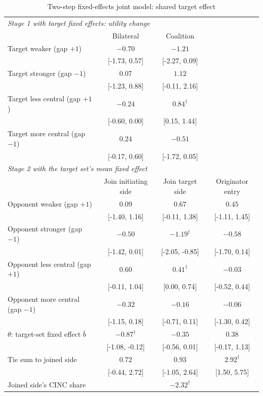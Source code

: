 \documentclass[11pt]{article}
\begin{document}
\clearpage
\begin{table}[!htbp]\centering\small
\caption{Two-step fixed-effects joint model: shared target effect}\label{tab:jointfe}
\begin{tabular}{lccc}
\toprule
\multicolumn{4}{l}{\emph{Stage 1 with target fixed effects: utility change}} \\
 & Bilateral & Coalition & \\
Target weaker (gap $+1$) & $-0.70$ & $-1.21$ &  \\
 & [-1.73, 0.57] & [-2.27, 0.09] &  \\
Target stronger (gap $-1$) & $0.07$ & $1.12$ &  \\
 & [-1.23, 0.88] & [-0.11, 2.16] &  \\
Target less central (gap $+1$) & $-0.24$ & $0.84^{\dagger}$ &  \\
 & [-0.60, 0.00] & [0.15, 1.44] &  \\
Target more central (gap $-1$) & $0.24$ & $-0.51$ &  \\
 & [-0.17, 0.60] & [-1.72, 0.05] &  \\
\midrule
\multicolumn{4}{l}{\emph{Stage 2 with the target set's mean fixed effect}} \\
 & Join initiating side & Join target side & Originator entry \\
Opponent weaker (gap $+1$) & $0.09$ & $0.67$ & $0.45$ \\
 & [-1.40, 1.16] & [-0.11, 1.38] & [-1.11, 1.45] \\
Opponent stronger (gap $-1$) & $-0.50$ & $-1.19^{\dagger}$ & $-0.58$ \\
 & [-1.42, 0.01] & [-2.05, -0.85] & [-1.70, 0.14] \\
Opponent less central (gap $+1$) & $0.60$ & $0.41^{\dagger}$ & $-0.03$ \\
 & [-0.11, 1.04] & [0.00, 0.74] & [-0.52, 0.44] \\
Opponent more central (gap $-1$) & $-0.32$ & $-0.16$ & $-0.06$ \\
 & [-1.15, 0.18] & [-0.71, 0.11] & [-1.30, 0.42] \\
$\theta$: target-set fixed effect $\bar b$ & $-0.87^{\dagger}$ & $-0.35$ & $0.38$ \\
 & [-1.08, -0.12] & [-0.56, 0.01] & [-0.17, 1.13] \\
Tie sum to joined side & $0.72$ & $0.93$ & $2.92^{\dagger}$ \\
 & [-0.44, 2.72] & [-1.05, 2.64] & [1.50, 5.75] \\
Joined side's CINC share &  & $-2.32^{\dagger}$ &  \\

\end{tabular}
\end{table}
\end{document}
